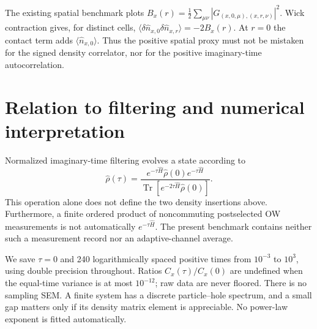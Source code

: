 \documentclass[aps,prb,onecolumn,nofootinbib,superscriptaddress]{revtex4-2}
\begin{document}
The existing spatial benchmark plots
$B_x(r)=\tfrac12\sum_{\mu\nu}|G_{(x,0,\mu),(x,r,\nu)}|^2$.
Wick contraction gives, for distinct cells,
$\langle\delta\hat n_{x,0}\delta\hat n_{x,r}\rangle=-2B_x(r)$.
At $r=0$ the contact term adds $\langle\hat n_{x,0}\rangle$.
Thus the positive spatial proxy must not be mistaken for the signed density
correlator, nor for the positive imaginary-time autocorrelation.

\section{Relation to filtering and numerical interpretation}
Normalized imaginary-time filtering evolves a state according to
\begin{equation}
 \hat\rho(\tau)=\frac{e^{-\tau\hat H}\hat\rho(0)e^{-\tau\hat H}}
 {\operatorname{Tr}[e^{-2\tau\hat H}\hat\rho(0)]}.
\end{equation}
This operation alone does not define the two density insertions above.
Furthermore, a finite ordered product of noncommuting postselected OW
measurements is not automatically $e^{-\tau\hat H}$. The present benchmark
contains neither such a measurement record nor an adaptive-channel average.

We save $\tau=0$ and 240 logarithmically spaced positive times from $10^{-3}$
to $10^3$, using double precision throughout. Ratios $C_x(\tau)/C_x(0)$ are
undefined when the equal-time variance is at most $10^{-12}$; raw data are
never floored. There is no sampling SEM. A finite system has a discrete
particle--hole spectrum, and a small gap matters only if its density matrix
element is appreciable. No power-law exponent is fitted automatically.
\end{document}
